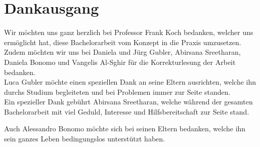 \section{Dankausgang}
Wir möchten uns ganz herzlich bei Professor Frank Koch bedanken, welcher uns ermöglicht hat, diese Bachelorarbeit vom Konzept in die Praxis umzusetzen. \\

Zudem möchten wir uns bei Daniela und Jürg Gubler, Abirsana Sreetharan, Daniela Bonomo und Vangelis Al-Sghir für die Korrekturlesung der Arbeit bedanken. \\

Luca Gubler möchte einen speziellen Dank an seine Eltern ausrichten, welche ihn durchs Studium begleiteten und bei Problemen immer zur Seite standen.\\
Ein spezieller Dank gebührt Abirsana Sreetharan, welche während der gesamten Bachelorarbeit mit viel Geduld, Interesse und Hilfsbereitschaft zur Seite stand.

Auch Alessandro Bonomo möchte sich bei seinen Eltern bedanken, welche ihn sein ganzes Leben bedingungslos unterstützt haben. 